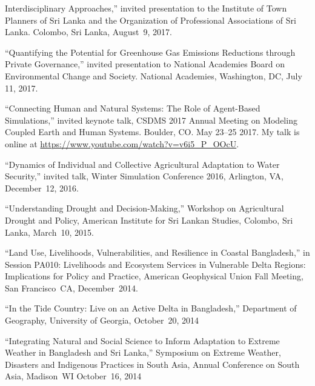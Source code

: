   Interdisciplinary Approaches,'' invited presentation to the Institute of Town
  Planners of Sri Lanka and the Organization of Professional Associations of
  Sri Lanka. Colombo, Sri Lanka, August~9, 2017.
\item ``Quantifying the Potential for Greenhouse Gas Emissions Reductions
  through Private Governance,'' invited presentation to National Academies
  Board on Environmental Change and Society. National Academies, Washington,
  DC, July 11, 2017.
\item  ``Connecting Human and Natural Systems: The Role of Agent-Based
  Simulations,'' invited keynote talk, CSDMS 2017 Annual Meeting on Modeling
  Coupled Earth and Human Systems. Boulder, CO. May 23--25 2017.
  My talk is online at
  \url{https://www.youtube.com/watch?v=v6i5_P_OOcU}.
\item  ``Dynamics of Individual and Collective Agricultural Adaptation to Water
  Security,'' invited talk, Winter Simulation Conference 2016, Arlington, VA,
  December~12, 2016.
\item ``Understanding Drought and Decision-Making,'' Workshop on Agricultural
  Drought and Policy, American Institute for Sri Lankan Studies, Colombo, Sri
  Lanka, March~10, 2015.
\item ``Land Use, Livelihoods, Vulnerabilities, and Resilience in Coastal
  Bangladesh,'' in Session PA010: Livelihoods and Ecosystem Services in
  Vulnerable Delta Regions: Implications for Policy and Practice, American
  Geophysical Union Fall Meeting, San Francisco~CA, December~2014.
\item ``In the Tide Country: Live on an Active Delta in Bangladesh,''
  Department of Geography, University of Georgia, October~20, 2014
\item ``Integrating Natural and Social Science to Inform Adaptation to Extreme
  Weather in Bangladesh and Sri Lanka,'' Symposium on Extreme Weather,
  Disasters and Indigenous Practices in South Asia, Annual Conference on South
  Asia, Madison~WI October~16, 2014
